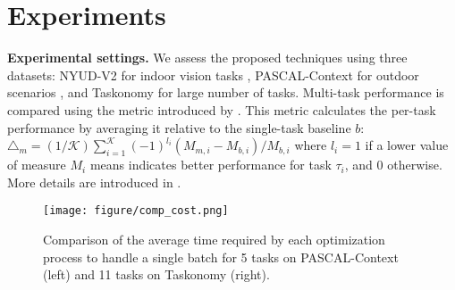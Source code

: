 \section{Experiments}
\label{sec:exp}
\textbf{Experimental settings.} We assess the proposed techniques using three datasets: NYUD-V2 for indoor vision tasks \citep{RN15}, PASCAL-Context for outdoor scenarios \citep{mottaghi2014role}, and Taskonomy \citep{zamir2018taskonomy} for large number of tasks. Multi-task performance is compared using the metric introduced by \citep{RN2}. This metric calculates the per-task performance by averaging it relative to the single-task baseline $b$: $\triangle_m = (1/\mathcal{K})\sum_{i=1}^{\mathcal{K}}(-1)^{l_i}(M_{m,i}-M_{b,i})/M_{b,i}$ where $l_i=1$ if a lower value of measure $M_i$ means indicates better performance for task $\tau_i$, and 0 otherwise. More details are introduced in .

\begin{table*}[t]
\caption{Comparison of time complexity and memory consumption between our optimization methods and other multi-task optimization approaches, including loss-based and gradient-based methods.}
\vspace{-5pt}
\centering
\renewcommand\arraystretch{1.00}
\label{tab:comp_cost}
\end{table*}
\begin{figure}[t]
    \vspace{-10pt}
    \centering
    \texttt{[image: figure/comp\_cost.png]}
    \vspace{-5pt}
    \caption{Comparison of the average time required by each optimization process to handle a single batch for 5 tasks on PASCAL-Context (left) and 11 tasks on Taskonomy (right).}
    \vspace{-10pt}
\label{fig:comp_cost}
\end{figure}


